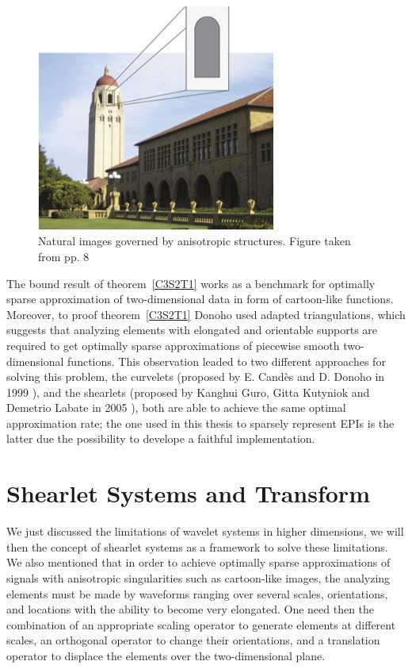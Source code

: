 \begin{figure}[h!]
\centering
\includegraphics[width = 0.7\textwidth]{./Diagrams/edges-images.jpg}
\caption{Natural images governed by anisotropic structures. Figure taken from \cite{IntroShearlets} pp. 8}
\label{edges-images}
\end{figure}

\bigskip

The bound result of theorem~\ref{C3S2T1} works as a benchmark for optimally sparse approximation of two-dimensional data in form of cartoon-like functions. Moreover, to proof theorem~\ref{C3S2T1} Donoho used adapted triangulations, which suggests that analyzing elements with elongated and orientable supports are required to get optimally sparse approximations of piecewise smooth two-dimensional functions. This observation leaded to two different approaches for solving this problem, the curvelets (proposed by E. Candès and D. Donoho in 1999 \cite{Curvelets}), and the shearlets (proposed by Kanghui Guro, Gitta Kutyniok and Demetrio Labate in 2005 \cite{FirstShearlets}), both are able to achieve the same optimal approximation rate; the one used in this thesis to sparsely represent EPIs is the latter due the possibility to develope a faithful implementation. 

\section{Shearlet Systems and Transform}
\label{sec:shearletsystem}

We just discussed the limitations of wavelet systems in higher dimensions, we will then the concept of shearlet systems as a framework to solve these limitations. We also mentioned that in order to achieve optimally sparse approximations of signals with anisotropic singularities such as cartoon-like images, the analyzing elements must be made by waveforms ranging over several scales, orientations, and locations with the ability to become very elongated. One need then the combination of an appropriate scaling operator to generate elements at different scales, an orthogonal operator to change their orientations, and a translation operator to displace the elements over the two-dimensional plane. 

